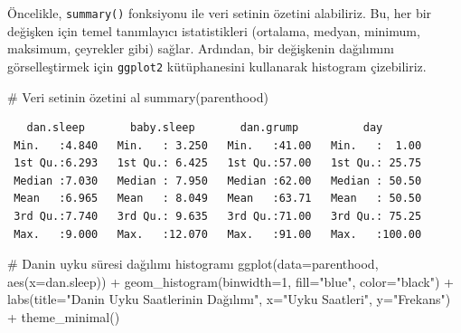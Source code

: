 \documentclass[
  letterpaper,
  DIV=11,
  numbers=noendperiod]{scrartcl}
\newenvironment{Shaded}{\begin{snugshade}}{\end{snugshade}}
\newcommand{\AttributeTok}[1]{\textcolor[rgb]{0.40,0.45,0.13}{#1}}
\newcommand{\CommentTok}[1]{\textcolor[rgb]{0.37,0.37,0.37}{#1}}
\newcommand{\DecValTok}[1]{\textcolor[rgb]{0.68,0.00,0.00}{#1}}
\newcommand{\FunctionTok}[1]{\textcolor[rgb]{0.28,0.35,0.67}{#1}}
\newcommand{\NormalTok}[1]{\textcolor[rgb]{0.00,0.23,0.31}{#1}}
\newcommand{\SpecialCharTok}[1]{\textcolor[rgb]{0.37,0.37,0.37}{#1}}
\newcommand{\StringTok}[1]{\textcolor[rgb]{0.13,0.47,0.30}{#1}}
\begin{document}
Öncelikle, \texttt{summary()} fonksiyonu ile veri setinin özetini
alabiliriz. Bu, her bir değişken için temel tanımlayıcı istatistikleri
(ortalama, medyan, minimum, maksimum, çeyrekler gibi) sağlar. Ardından,
bir değişkenin dağılımını görselleştirmek için \texttt{ggplot2}
kütüphanesini kullanarak histogram çizebiliriz.

\begin{Shaded}
\begin{Highlighting}[]
\CommentTok{\# Veri setinin özetini al}
\FunctionTok{summary}\NormalTok{(parenthood)}
\end{Highlighting}
\end{Shaded}

\begin{verbatim}
   dan.sleep       baby.sleep       dan.grump          day        
 Min.   :4.840   Min.   : 3.250   Min.   :41.00   Min.   :  1.00  
 1st Qu.:6.293   1st Qu.: 6.425   1st Qu.:57.00   1st Qu.: 25.75  
 Median :7.030   Median : 7.950   Median :62.00   Median : 50.50  
 Mean   :6.965   Mean   : 8.049   Mean   :63.71   Mean   : 50.50  
 3rd Qu.:7.740   3rd Qu.: 9.635   3rd Qu.:71.00   3rd Qu.: 75.25  
 Max.   :9.000   Max.   :12.070   Max.   :91.00   Max.   :100.00  
\end{verbatim}

\begin{Shaded}
\begin{Highlighting}[]
\CommentTok{\# Dan\textquotesingle{}in uyku süresi dağılımı histogramı}
\FunctionTok{ggplot}\NormalTok{(}\AttributeTok{data=}\NormalTok{parenthood, }\FunctionTok{aes}\NormalTok{(}\AttributeTok{x=}\NormalTok{dan.sleep)) }\SpecialCharTok{+} 
  \FunctionTok{geom\_histogram}\NormalTok{(}\AttributeTok{binwidth=}\DecValTok{1}\NormalTok{, }\AttributeTok{fill=}\StringTok{"blue"}\NormalTok{, }\AttributeTok{color=}\StringTok{"black"}\NormalTok{) }\SpecialCharTok{+}
  \FunctionTok{labs}\NormalTok{(}\AttributeTok{title=}\StringTok{"Dan\textquotesingle{}in Uyku Saatlerinin Dağılımı"}\NormalTok{, }\AttributeTok{x=}\StringTok{"Uyku Saatleri"}\NormalTok{, }\AttributeTok{y=}\StringTok{"Frekans"}\NormalTok{) }\SpecialCharTok{+}
  \FunctionTok{theme\_minimal}\NormalTok{()}
\end{Highlighting}
\end{Shaded}
\end{document}
